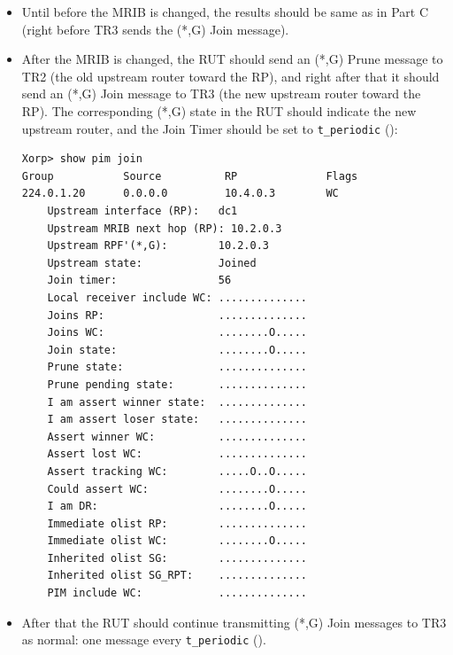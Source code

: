\documentclass[11pt]{report}
\begin{document}

\begin{itemize}

  \item Until before the MRIB is changed, the results should
  be same as in Part C (right before TR3 sends the (*,G) Join message).

  \item After the MRIB is changed, the RUT should send an (*,G) Prune
  message to TR2 (the old upstream router toward the RP), and right after that
  it should send an (*,G) Join message to TR3 (the new upstream router
  toward the RP). The corresponding (*,G) state in the RUT should
  indicate the new upstream router, and the Join Timer should be set
  to \verb=t_periodic= ({\PimsmTPeriodic}):

\begin{verbatim}
Xorp> show pim join 
Group           Source          RP              Flags
224.0.1.20      0.0.0.0         10.4.0.3        WC   
    Upstream interface (RP):   dc1
    Upstream MRIB next hop (RP): 10.2.0.3
    Upstream RPF'(*,G):        10.2.0.3
    Upstream state:            Joined 
    Join timer:                56
    Local receiver include WC: ..............
    Joins RP:                  ..............
    Joins WC:                  ........O.....
    Join state:                ........O.....
    Prune state:               ..............
    Prune pending state:       ..............
    I am assert winner state:  ..............
    I am assert loser state:   ..............
    Assert winner WC:          ..............
    Assert lost WC:            ..............
    Assert tracking WC:        .....O..O.....
    Could assert WC:           ........O.....
    I am DR:                   ........O.....
    Immediate olist RP:        ..............
    Immediate olist WC:        ........O.....
    Inherited olist SG:        ..............
    Inherited olist SG_RPT:    ..............
    PIM include WC:            ..............
\end{verbatim}

  \item After that the RUT should continue transmitting 
  (*,G) Join messages to TR3 as normal: one message every \verb=t_periodic=
  ({\PimsmTPeriodic}).

\end{itemize}

\end{document}
